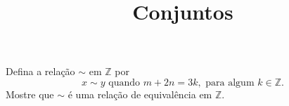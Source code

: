 \documentclass{beamer}
\title{Conjuntos}
\author[\autor]{\autor}
\institute[\instituto]{\instituto}
\date{}
\begin{document}
    \begin{frame}
        \maketitle
    \end{frame}


    \begin{frame}
        \begin{exercicio}
            Defina a relação $\sim$ em $\mathbb{Z}$ por
            \[
                x \sim y \mbox{ quando } m + 2n = 3k,\mbox{ para algum } k \in \mathbb{Z}.
            \]
            Mostre que $\sim$ é uma relação de equivalência em $\mathbb{Z}$.
        \end{exercicio}

        \vspace{6cm}
    \end{frame}
\end{document}
